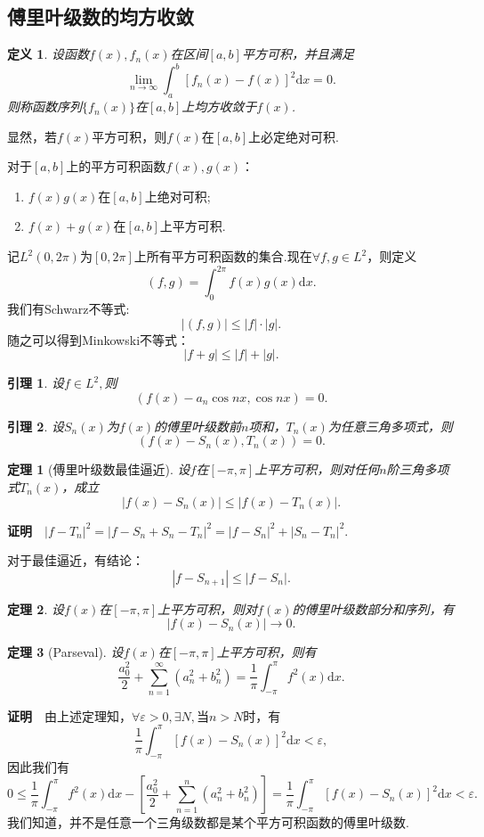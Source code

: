 \documentclass[UTF8]{article}
\newcommand{\dx}{\mathrm{d}x}
\newcommand{\zm}{\textbf{证明}$\quad$}
\newtheorem{thm}{\hspace{2em}定理}[section]
\newtheorem{lem}{\hspace{2em}引理}[section]
\newtheorem{dfn}{\hspace{2em}定义}[section]
\begin{document}
  \subsection{傅里叶级数的均方收敛}
  \begin{dfn}
    设函数$f(x),f_n(x)$在区间$[a,b]$平方可积，并且满足
    $$\lim_{n\to\infty}\int_a^b[f_n(x)-f(x)]^2\dx=0.$$
    则称函数序列$\{f_n(x)\}$在$[a,b]$上均方收敛于$f(x)$.
  \end{dfn}
  显然，若$f(x)$平方可积，则$f(x)$在$[a,b]$上必定绝对可积.

  对于$[a,b]$上的平方可积函数$f(x),g(x)$：
  \begin{enumerate}
    \item $f(x)g(x)$在$[a,b]$上绝对可积;
    \item $f(x)+g(x)$在$[a,b]$上平方可积.
  \end{enumerate}
  记$L^2(0,2\pi)$为$[0,2\pi]$上所有平方可积函数的集合.现在$\forall f,g\in L^2$，则定义
  $$(f,g)=\int_0^{2\pi}f(x)g(x)\dx.$$
  我们有Schwarz不等式:
  $$|(f,g)|\le |f|\cdot|g|.$$
  随之可以得到Minkowski不等式：
  $$|f+g|\le |f|+|g|.$$
  \begin{lem}
    设$f\in L^2,$则$$(f(x)-a_n\cos nx,\cos nx)=0.$$
  \end{lem}
  \begin{lem}
    设$S_n(x)$为$f(x)$的傅里叶级数前$n$项和，$T_n(x)$为任意三角多项式，则
    $$(f(x)-S_n(x),T_n(x))=0.$$
  \end{lem}
  \begin{thm}[傅里叶级数最佳逼近]
    设$f$在$[-\pi,\pi]$上平方可积，则对任何$n$阶三角多项式$T_n(x)$，成立
    $$|f(x)-S_n(x)|\le|f(x)-T_n(x)|.$$
  \end{thm}
  \zm $|f-T_n|^2=|f-S_n+S_n-T_n|^2=|f-S_n|^2+|S_n-T_n|^2.$

  对于最佳逼近，有结论：
  $$|f-S_{n+1}|\le|f-S_{n}|.$$
  \begin{thm}
    设$f(x)$在$[-\pi,\pi]$上平方可积，则对$f(x)$的傅里叶级数部分和序列，有
    $$|f(x)-S_n(x)|\to 0.$$
  \end{thm}
  \begin{thm}[Parseval]
    设$f(x)$在$[-\pi,\pi]$上平方可积，则有
    $$\frac{a_0^2}{2}+\sum_{n=1}^\infty(a_n^2+b_n^2)=\frac{1}{\pi}\int_{-\pi}^\pi f^2(x)\dx.$$
  \end{thm}
  \zm 由上述定理知，$\forall \varepsilon>0,\exists N,$当$n>N$时，有
  $$\frac{1}{\pi}\int_{-\pi}^\pi[f(x)-S_n(x)]^2\dx<\varepsilon,$$
  因此我们有
  $$0\le\frac{1}{\pi}\int_{-\pi}^\pi f^2(x)\dx-
  \left[\frac{a_0^2}{2}+\sum_{n=1}^n(a_n^2+b_n^2)\right]=
  \frac{1}{\pi}\int_{-\pi}^\pi[f(x)-S_n(x)]^2\dx<\varepsilon.$$
  我们知道，并不是任意一个三角级数都是某个平方可积函数的傅里叶级数.
\end{document}
